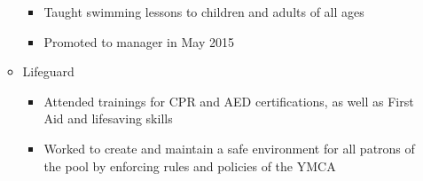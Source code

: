 \begin{enumerate}[label={\Roman*}.]
\begin{itemize}
\begin{itemize}
\item Taught swimming lessons to children and adults of all ages
\item Promoted to manager in May 2015
\end{itemize}
\item Lifeguard
\begin{itemize}
\item Attended trainings for CPR and AED certifications, as well as First Aid and lifesaving skills
\item Worked to create and maintain a safe environment for all patrons of the pool by enforcing rules and
policies of the YMCA
\end{itemize}
\end{itemize}
\end{enumerate}
